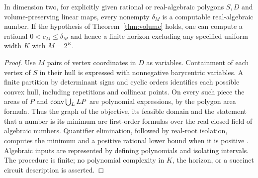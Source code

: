 \begin{corollary}\label{cor:effective}
In dimension two, for explicitly given rational or real-algebraic
polygons $S,D$ and volume-preserving linear maps, every nonempty
$\delta_M$ is a computable real-algebraic number. If the hypothesis of
Theorem~\ref{thm:volume} holds, one can compute a rational
$0<c_M\le\delta_M$ and hence a finite horizon excluding any specified
uniform width $K$ with $M=2^K$.
\end{corollary}
\begin{proof}
Use $M$ pairs of vertex coordinates in $D$ as variables. Containment of
each vertex of $S$ in their hull is expressed with nonnegative
barycentric variables. A finite partition by determinant signs and
cyclic orders identifies each possible convex hull, including
repetitions and collinear points. On every such piece the areas of
$P$ and $\operatorname{conv}\bigcup_LLP$ are polynomial expressions, by the polygon
area formula. Thus the graph of the objective, its feasible domain and
the statement that a number is its minimum are first-order formulas over
the real closed field of algebraic numbers. Quantifier elimination,
followed by real-root isolation, computes the minimum and a positive
rational lower bound when it is positive \cite{BPR}.
Algebraic inputs are represented by defining polynomials and isolating
intervals. The procedure is finite; no polynomial complexity in $K$,
the horizon, or a succinct circuit description is asserted.
\end{proof}
